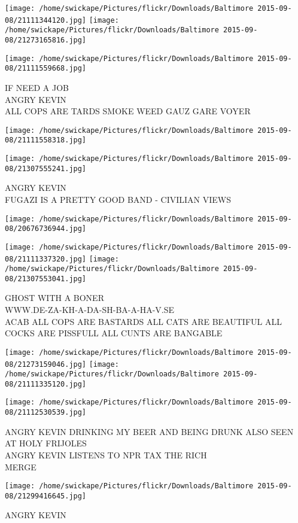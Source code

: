 \documentclass[10pt,letterpaper]{article}
\begin{document}
\texttt{[image: /home/swickape/Pictures/flickr/Downloads/Baltimore 2015-09-08/21111344120.jpg]}
\texttt{[image: /home/swickape/Pictures/flickr/Downloads/Baltimore 2015-09-08/21273165816.jpg]}

\vspace{0.25in}
\texttt{[image: /home/swickape/Pictures/flickr/Downloads/Baltimore 2015-09-08/21111559668.jpg]}

IF NEED A JOB\\
ANGRY KEVIN\\
ALL COPS ARE TARDS SMOKE WEED GAUZ GARE VOYER\\
\pagebreak

\texttt{[image: /home/swickape/Pictures/flickr/Downloads/Baltimore 2015-09-08/21111558318.jpg]}

\vspace{0.25in}
\texttt{[image: /home/swickape/Pictures/flickr/Downloads/Baltimore 2015-09-08/21307555241.jpg]}

ANGRY KEVIN\\
FUGAZI IS A PRETTY GOOD BAND {-} CIVILIAN VIEWS\\
\pagebreak

\texttt{[image: /home/swickape/Pictures/flickr/Downloads/Baltimore 2015-09-08/20676736944.jpg]}

\vspace{0.25in}
\texttt{[image: /home/swickape/Pictures/flickr/Downloads/Baltimore 2015-09-08/21111337320.jpg]}
\texttt{[image: /home/swickape/Pictures/flickr/Downloads/Baltimore 2015-09-08/21307553041.jpg]}

GHOST WITH A BONER\\
WWW.DE{-}ZA{-}KH{-}A{-}DA{-}SH{-}BA{-}A{-}HA{-}V.SE\\
ACAB ALL COPS ARE BASTARDS ALL CATS ARE BEAUTIFUL ALL COCKS ARE PISSFULL ALL CUNTS ARE BANGABLE\\
\pagebreak

\texttt{[image: /home/swickape/Pictures/flickr/Downloads/Baltimore 2015-09-08/21273159046.jpg]}
\texttt{[image: /home/swickape/Pictures/flickr/Downloads/Baltimore 2015-09-08/21111335120.jpg]}

\texttt{[image: /home/swickape/Pictures/flickr/Downloads/Baltimore 2015-09-08/21112530539.jpg]}

ANGRY KEVIN DRINKING MY BEER AND BEING DRUNK ALSO SEEN AT HOLY FRIJOLES\\
ANGRY KEVIN LISTENS TO NPR TAX THE RICH\\
MERGE\\
\pagebreak

\texttt{[image: /home/swickape/Pictures/flickr/Downloads/Baltimore 2015-09-08/21299416645.jpg]}

ANGRY KEVIN\\
\pagebreak
\end{document}

